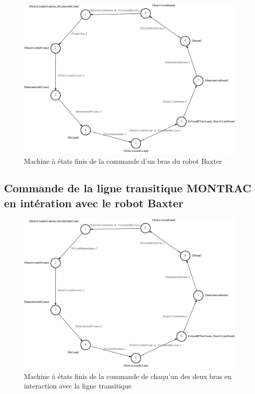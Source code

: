 \documentclass[a4paper,french, titlepage]{book}
\begin{document}
\begin{figure}[H] 
\begin{center}
\includegraphics[scale=0.5]{Images/main_commande_1_bras.pdf} 
\end{center}
\caption{Machine à états finis de la commande d'un bras du robot Baxter}
\label{main_commande_1_bras}
\end{figure} 

\subsection{Commande de la ligne transitique MONTRAC en intération avec le robot Baxter}

\begin{figure}[H] 
\begin{center}
\includegraphics[scale=0.5]{Images/main_commande_bras_GD.pdf} 
\end{center}
\caption{Machine à états finis de la commande de chaqu'un des deux bras en interaction avec la ligne transitique}
\label{main_commande_bras_GD}
\end{figure}
\end{document}
